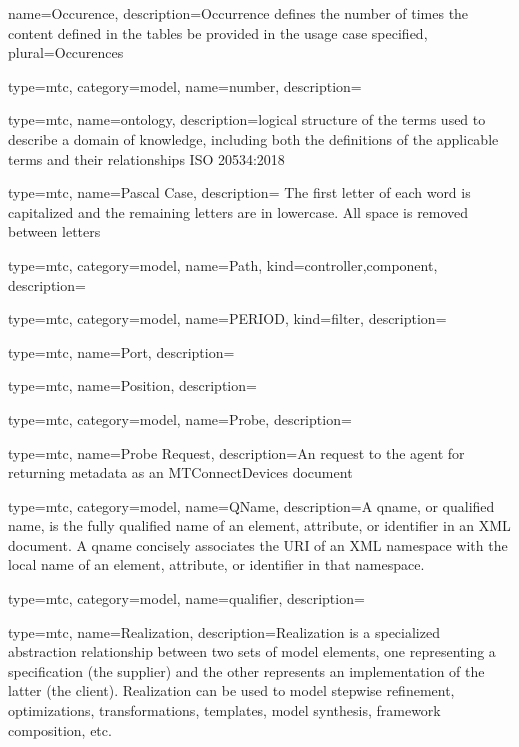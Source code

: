 {
  name={Occurence},
  description={Occurrence defines the number of times the content defined in the tables \MAY be provided in the usage case specified},
  plural={Occurences}
}


{
  type=mtc,
  category=model,
  name={number},
  description={}
}


{
  type=mtc,
  name=ontology,
  description={logical structure of the terms used to describe a domain of knowledge, including both the definitions of the applicable terms and their relationships ISO 20534:2018}
}


{
  type=mtc,
  name={Pascal Case},
  description= {The first letter of each word is capitalized and the remaining letters are in lowercase. All space is removed between letters}
}


{
  type=mtc,
  category=model,
  name={Path},
  kind={controller,component},
  description= {}
}


{
  type=mtc,
  category=model,
  name={PERIOD},
  kind={filter},
  description={}
}


{
  type=mtc,
  name={Port},
  description={}
}


{
  type=mtc,
  name={Position},
  description={}
}


{
  type=mtc,
  category=model,
  name={Probe},
  description={}
}


{
  type=mtc,
  name={Probe Request},
  description={An  request to the \gls{agent} for returning metadata as an MTConnectDevices  document}
}


{
  type=mtc,
  category=model,
  name={QName},
  description={A \gls{qname}, or qualified name, is the fully qualified name of an element, attribute, or identifier in an XML document. A  \gls{qname} concisely associates the URI of an XML namespace with the local name of an element, attribute, or identifier in that namespace.}
}


{
  type=mtc,
  category=model,
  name={qualifier},
  description={}
}


{
  type=mtc,
  name={Realization},
  description={Realization is a specialized abstraction relationship between two sets of model elements, one representing a specification (the supplier) and the other represents an implementation of the latter (the client). Realization can be used to model stepwise refinement, optimizations, transformations, templates, model synthesis, framework composition, etc.}
}


